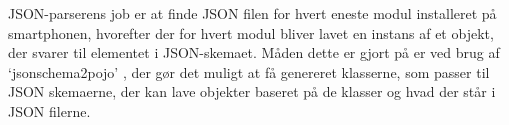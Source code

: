JSON-parserens job er at finde JSON filen for hvert eneste modul installeret på smartphonen, hvorefter der for hvert modul bliver lavet en instans af et objekt, der svarer til  elementet i JSON-skemaet.
Måden dette er gjort på er ved brug af `jsonschema2pojo' \citep{jsonpojo}, der gør det muligt at få genereret klasserne, som passer til JSON skemaerne, der kan lave objekter baseret på de klasser og hvad der står i JSON filerne.
